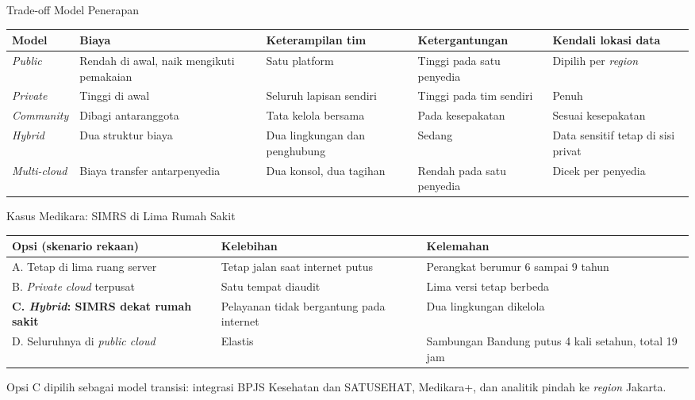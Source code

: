\documentclass[aspectratio=169, table, 12pt]{beamer}
\begin{document}
\begin{frame}{Trade-off Model Penerapan}
  \footnotesize
  \begin{tabularx}{\textwidth}{>{\raggedright\arraybackslash}p{1.8cm}
      >{\raggedright\arraybackslash}X >{\raggedright\arraybackslash}X
      >{\raggedright\arraybackslash}X >{\raggedright\arraybackslash}X}
    \hline
    \textbf{Model} & \textbf{Biaya} & \textbf{Keterampilan tim} & \textbf{Ketergantungan} &
      \textbf{Kendali lokasi data} \\
    \hline
    \textit{Public} & Rendah di awal, naik mengikuti pemakaian & Satu platform & Tinggi pada
      satu penyedia & Dipilih per \textit{region} \\
    \hline
    \textit{Private} & Tinggi di awal & Seluruh lapisan sendiri & Tinggi pada tim sendiri &
      Penuh \\
    \hline
    \textit{Community} & Dibagi antaranggota & Tata kelola bersama & Pada kesepakatan &
      Sesuai kesepakatan \\
    \hline
    \textit{Hybrid} & Dua struktur biaya & Dua lingkungan dan penghubung & Sedang & Data
      sensitif tetap di sisi privat \\
    \hline
    \textit{Multi-cloud} & Biaya transfer antarpenyedia & Dua konsol, dua tagihan & Rendah
      pada satu penyedia & Dicek per penyedia \\
    \hline
  \end{tabularx}
\end{frame}

\begin{frame}{Kasus Medikara: SIMRS di Lima Rumah Sakit}
  \footnotesize
  \begin{tabularx}{\textwidth}{>{\raggedright\arraybackslash}p{4.2cm}
      >{\raggedright\arraybackslash}X >{\raggedright\arraybackslash}X}
    \hline
    \textbf{Opsi (skenario rekaan)} & \textbf{Kelebihan} & \textbf{Kelemahan} \\
    \hline
    A. Tetap di lima ruang server & Tetap jalan saat internet putus & Perangkat berumur 6
      sampai 9 tahun \\
    \hline
    B. \textit{Private cloud} terpusat & Satu tempat diaudit & Lima versi tetap berbeda \\
    \hline
    \textbf{C. \textit{Hybrid}: SIMRS dekat rumah sakit} & Pelayanan tidak bergantung pada
      internet & Dua lingkungan dikelola \\
    \hline
    D. Seluruhnya di \textit{public cloud} & Elastis & Sambungan Bandung putus 4 kali setahun,
      total 19 jam \\
    \hline
  \end{tabularx}

  \vspace{8pt}
  \small Opsi C dipilih sebagai model transisi: integrasi BPJS Kesehatan dan SATUSEHAT,
  Medikara+, dan analitik pindah ke \textit{region} Jakarta.
\end{frame}
\end{document}
